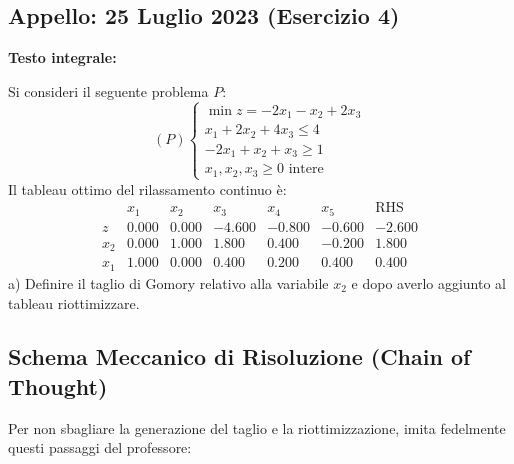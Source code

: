 \documentclass[11pt, a4paper]{article}
\begin{document}
\bigskip

\subsection{Appello: 25 Luglio 2023 (Esercizio 4)}

\textbf{Testo integrale:}

Si consideri il seguente problema $P$:
\[
(P)
\begin{cases}
\min z = -2x_1 - x_2 + 2x_3 \\
x_1 + 2x_2 + 4x_3 \le 4 \\
-2x_1 + x_2 + x_3 \ge 1 \\
x_1, x_2, x_3 \ge 0 \text{ intere}
\end{cases}
\]
Il tableau ottimo del rilassamento continuo è:
\[
\begin{array}{c|ccccc|c}
   & x_1 & x_2 & x_3 & x_4 & x_5 & \text{RHS} \\
\hline
z  & 0.000 & 0.000 & -4.600 & -0.800 & -0.600 & -2.600 \\
\hline
x_2 & 0.000 & 1.000 & 1.800 & 0.400 & -0.200 & 1.800 \\
x_1 & 1.000 & 0.000 & 0.400 & 0.200 & 0.400 & 0.400
\end{array}
\]
a) Definire il taglio di Gomory relativo alla variabile $x_2$ e dopo averlo aggiunto al tableau riottimizzare.

\bigskip

\subsection{Schema Meccanico di Risoluzione (Chain of Thought)}

Per non sbagliare la generazione del taglio e la riottimizzazione, imita fedelmente questi passaggi del professore:
\end{document}
